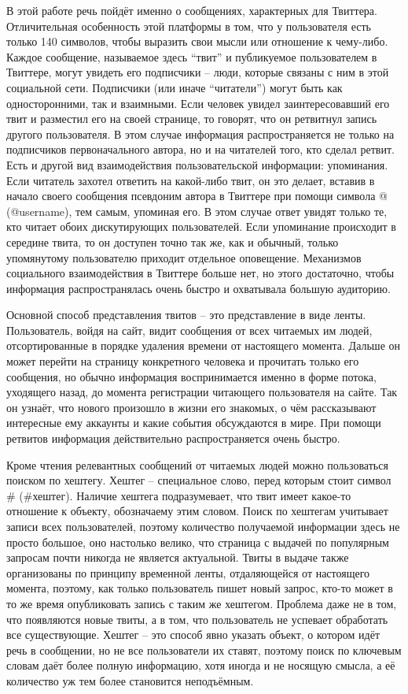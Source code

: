 В этой работе речь пойдёт именно о сообщениях, характерных для Твиттера.
Отличительная особенность этой платформы в том, что у пользователя есть
только 140 символов, чтобы выразить свои мысли или отношение к чему-либо.
Каждое сообщение, называемое здесь ``твит'' и публикуемое пользователем в
Твиттере, могут увидеть его подписчики -- люди, которые связаны с ним в этой
социальной сети. Подписчики (или иначе ``читатели'') могут быть как
односторонними, так и взаимными. Если человек увидел заинтересовавший его твит
и разместил его на своей странице, то говорят, что он ретвитнул
запись другого пользователя. В этом случае информация распространяется не только
на подписчиков первоначального автора, но и на читателей того, кто сделал
ретвит. Есть и другой вид взаимодействия пользовательской
информации: упоминания. Если читатель захотел ответить на какой-либо твит,
он это делает, вставив в начало своего сообщения псевдоним автора в Твиттере при помощи
символа @ (@username), тем самым, упоминая его. В этом случае ответ увидят
только те, кто читает обоих дискутирующих пользователей. Если упоминание
происходит в середине твита, то он доступен точно так же, как и обычный,
только упомянутому пользователю приходит отдельное оповещение.
Механизмов социального взаимодействия в Твиттере больше нет, но этого достаточно,
чтобы информация распространялась очень быстро и охватывала большую аудиторию.

Основной способ представления твитов -- это представление в виде ленты.
Пользователь, войдя на сайт, видит сообщения от всех читаемых им людей,
отсортированные в порядке удаления времени от настоящего момента. Дальше
он может перейти на страницу конкретного человека и прочитать только его
сообщения,  но обычно информация воспринимается именно в форме потока,
уходящего назад, до момента регистрации читающего пользователя на сайте.
Так он узнаёт, что нового произошло в жизни его знакомых, о чём рассказывают
интересные ему аккаунты и какие события обсуждаются в мире. При помощи ретвитов
информация действительно распространяется очень быстро.

Кроме чтения релевантных сообщений от читаемых людей можно пользоваться
поиском по хештегу. Хештег -- специальное слово, перед которым
стоит символ \# (\#хештег). Наличие хештега подразумевает, что твит имеет какое-то
отношение к объекту, обозначаему этим словом. Поиск по хештегам учитывает
записи всех пользователей, поэтому количество получаемой информации здесь не
просто большое, оно настолько велико, что страница с выдачей по популярным
запросам почти никогда не является актуальной. Твиты в выдаче также организованы
по принципу временной ленты, отдаляющейся от настоящего момента, поэтому, как
только пользователь пишет новый запрос, кто-то может в то же время опубликовать запись с таким же хештегом.
Проблема даже не в том, что появляются новые твиты, а в том, что пользователь не
успевает обработать все существующие. Хештег -- это способ явно указать объект, о
котором идёт речь в сообщении, но не все пользователи их ставят, поэтому поиск
по ключевым словам даёт более полную информацию, хотя иногда и не носящую смысла,
а её количество уж тем более становится неподъёмным.

